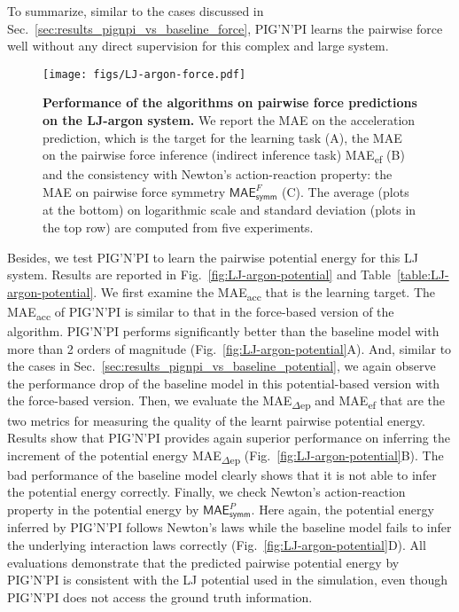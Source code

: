 \documentclass{article}
\newcommand{\pignpi}{PIG'N'PI\xspace}
\begin{document}
To summarize, similar to the cases discussed in Sec.~\ref{sec:results_pignpi_vs_baseline_force}, \pignpi learns the pairwise force well without any direct supervision for this complex and large system. 


\begin{figure}[h!]
    \centering
    \texttt{[image: figs/LJ-argon-force.pdf]}
    \caption{\textbf{Performance of the algorithms on pairwise force predictions on the LJ-argon system.} We report the MAE on the acceleration prediction, which is the target for the learning task  (A), the MAE on the pairwise force inference (indirect inference task) \textsf{MAE\textsubscript{ef}} (B) and the consistency with Newton's action-reaction property: the MAE on pairwise force symmetry $\textsf{MAE}_\textsf{symm}^{F}$ (C). The average (plots at the bottom) on logarithmic scale and standard deviation (plots in the top row) are computed from five experiments.}
    \label{fig:LJ-argon-force}
\end{figure}

Besides, we test \pignpi to learn the pairwise potential energy for this LJ system. Results are reported in Fig.~\ref{fig:LJ-argon-potential} and Table~\ref{table:LJ-argon-potential}. We first examine the \textsf{MAE\textsubscript{acc}} that is the learning target. The \textsf{MAE\textsubscript{acc}} of \pignpi is similar to that in the force-based version of the algorithm.  \pignpi performs significantly better than the baseline model with more than 2 orders of magnitude (Fig.~\ref{fig:LJ-argon-potential}A). And, similar to the cases in Sec.~\ref{sec:results_pignpi_vs_baseline_potential}, we again observe the performance drop of the baseline model in this potential-based version with the force-based version. Then, we evaluate the \textsf{MAE\textsubscript{$\Delta$ep}} and \textsf{MAE\textsubscript{ef}} that are the two metrics for measuring the quality of the learnt pairwise potential energy. Results show that \pignpi provides again superior performance on inferring the increment of the potential energy \textsf{MAE\textsubscript{$\Delta$ep}} (Fig.~\ref{fig:LJ-argon-potential}B). The bad performance of the baseline model clearly shows that it is not able to infer the potential energy correctly. Finally, we check Newton’s action-reaction property in the potential energy by $\textsf{MAE}_\textsf{symm}^{P}$. Here again, the potential energy inferred by \pignpi follows Newton's laws while the baseline model fails to infer the underlying interaction laws correctly (Fig.~\ref{fig:LJ-argon-potential}D). All evaluations demonstrate that the predicted pairwise potential energy by \pignpi is consistent with the LJ potential used in the simulation, even though \pignpi does not access the ground truth information.
\end{document}
